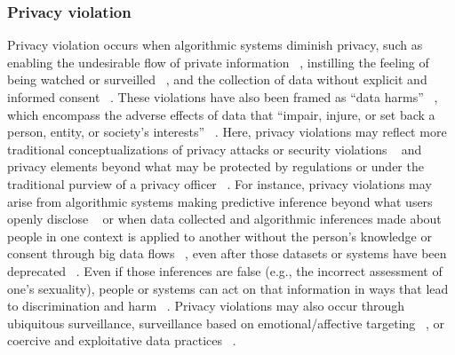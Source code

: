 \subsubsection{Privacy violation} Privacy violation occurs when algorithmic systems diminish privacy, such as enabling the undesirable flow of private information ~\cite{Ramesh_Kameswaran_Wang_Sambasivan_2022}, instilling the feeling of being watched or surveilled ~\cite{Redden_Brand_2017}, and the collection of data without explicit and informed consent ~\cite{Kapania_Siy_Clapper_Sp_Sambasivan_2022}. These violations have also been framed as “data harms” ~\cite{Monroe-White_2021}, which encompass the adverse effects of data that “impair, injure, or set back a person, entity, or society’s interests” ~\cite[n.p.]{Redden_Brand_2017}. Here, privacy violations may reflect more traditional conceptualizations of privacy attacks or security violations ~\cite{Douglas_2016, Hatzivasilis_2020} and privacy elements beyond what may be protected by regulations or under the traditional purview of a privacy officer ~\cite{Mann_Matzner_2019, Ramesh_Kameswaran_Wang_Sambasivan_2022}. For instance, privacy violations may arise from algorithmic systems making predictive inference beyond what users openly disclose ~\cite{Tufekci_Rit_Adam_Kramer_Guillory_Hancock} or when data collected and algorithmic inferences made about people in one context is applied to another without the person’s knowledge or consent through big data flows ~\cite{Mann_Matzner_2019}, even after those datasets or systems have been deprecated ~\cite{corry2021problem, Ehsan_Singh_Metcalf_Riedl_2022}. Even if those inferences are false (e.g., the incorrect assessment of one’s sexuality), people or systems can act on that information in ways that lead to discrimination and harm ~\cite{Weidinger2022}. Privacy violations may also occur through ubiquitous surveillance, surveillance based on emotional/affective targeting ~\cite{Solon_2017}, or coercive and exploitative data practices ~\cite{Kapania_Siy_Clapper_Sp_Sambasivan_2022}.


